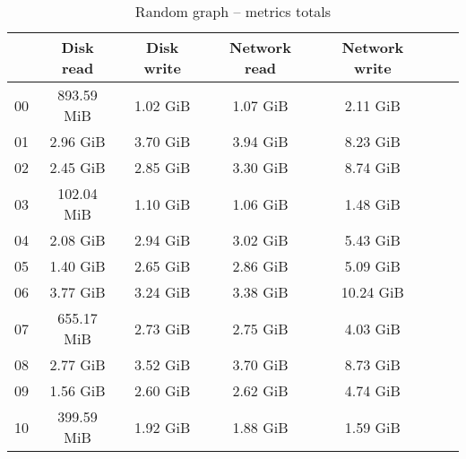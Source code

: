 \begin{table}[H]
\begin{center}
\caption{Random graph -- metrics totals}
\label{tab:graph-random-total}
\begin{tabular}{|c|c|c|c|c|c|c|}
\hline
   & Disk read & Disk write & Network read & Network write\\
\hline
00 & 893.59 MiB & 1.02 GiB & 1.07 GiB & 2.11 GiB\\
01 & 2.96 GiB & 3.70 GiB & 3.94 GiB & 8.23 GiB\\
02 & 2.45 GiB & 2.85 GiB & 3.30 GiB & 8.74 GiB\\
03 & 102.04 MiB & 1.10 GiB & 1.06 GiB & 1.48 GiB\\
04 & 2.08 GiB & 2.94 GiB & 3.02 GiB & 5.43 GiB\\
05 & 1.40 GiB & 2.65 GiB & 2.86 GiB & 5.09 GiB\\
06 & 3.77 GiB & 3.24 GiB & 3.38 GiB & 10.24 GiB\\
07 & 655.17 MiB & 2.73 GiB & 2.75 GiB & 4.03 GiB\\
08 & 2.77 GiB & 3.52 GiB & 3.70 GiB & 8.73 GiB\\
09 & 1.56 GiB & 2.60 GiB & 2.62 GiB & 4.74 GiB\\
10 & 399.59 MiB & 1.92 GiB & 1.88 GiB & 1.59 GiB\\
\hline
\end{tabular}
\end{center}
\end{table}
